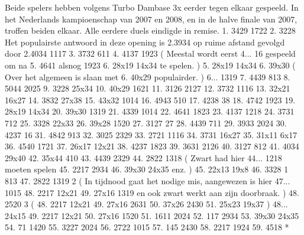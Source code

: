 \documentclass[letterpaper,10pt,english]{sphinxmanual}
\begin{document}
\begin{sphinxVerbatim}[commandchars=\\\{\}]
\PYGZob{} Beide spelers hebben volgens Turbo Dambase 3x eerder tegen elkaar
gespeeld. In het Nederlands kampioenschap van 2007 en 2008, en in de
halve finale van 2007, troffen beiden elkaar. Alle eerdere duels
eindigde in remise. \PYGZcb{} 1. 34\PYGZhy{}29 17\PYGZhy{}22 2. 32\PYGZhy{}28 \PYGZob{} Het populairste
antwoord in deze opening is 2.39\PYGZhy{}34 op ruime afstand gevolgd door
2.40\PYGZhy{}34 \PYGZcb{} 11\PYGZhy{}17 3. 37\PYGZhy{}32 6\PYGZhy{}11 4. 41\PYGZhy{}37 19\PYGZhy{}23 ( \PYGZob{} Meestal wordt eerst
\PYGZcb{} 4... 1\PYGZhy{}6 \PYGZob{} gespeeld om na \PYGZcb{} 5. 46\PYGZhy{}41 \PYGZob{} alsnog \PYGZcb{} 19\PYGZhy{}23 6. 28x19
14x34 \PYGZob{} te spelen. \PYGZcb{} ) 5. 28x19 14x34 6. 39x30 ( \PYGZob{} Over het algemeen
is slaan met \PYGZcb{} 6. 40x29 \PYGZob{} populairder. \PYGZcb{} ) 6... 13\PYGZhy{}19 7. 44\PYGZhy{}39 8\PYGZhy{}13
8. 50\PYGZhy{}44 20\PYGZhy{}25 9. 32\PYGZhy{}28 25x34 10. 40x29 16\PYGZhy{}21 11. 31\PYGZhy{}26 21\PYGZhy{}27
12. 37\PYGZhy{}32 11\PYGZhy{}16 13. 32x21 16x27 14. 38\PYGZhy{}32 27x38 15. 43x32 10\PYGZhy{}14
16. 49\PYGZhy{}43 5\PYGZhy{}10 17. 42\PYGZhy{}38 3\PYGZhy{}8 18. 47\PYGZhy{}42 19\PYGZhy{}23 19. 28x19 14x34
20. 39x30 13\PYGZhy{}19 21. 43\PYGZhy{}39 10\PYGZhy{}14 22. 46\PYGZhy{}41 18\PYGZhy{}23 23. 41\PYGZhy{}37 12\PYGZhy{}18
24. 37\PYGZhy{}31 7\PYGZhy{}12 25. 33\PYGZhy{}28 22x33 26. 39x28 15\PYGZhy{}20 27. 31\PYGZhy{}27 2\PYGZhy{}7
28. 44\PYGZhy{}39 7\PYGZhy{}11 29. 39\PYGZhy{}33 20\PYGZhy{}24 30. 42\PYGZhy{}37 1\PYGZhy{}6 31. 48\PYGZhy{}42 9\PYGZhy{}13 32. 30\PYGZhy{}25
23\PYGZhy{}29 33. 27\PYGZhy{}21 11\PYGZhy{}16 34. 37\PYGZhy{}31 16x27 35. 31x11 6x17 36. 45\PYGZhy{}40 17\PYGZhy{}21
37. 26x17 12x21 38. 42\PYGZhy{}37 18\PYGZhy{}23 39. 36\PYGZhy{}31 21\PYGZhy{}26 40. 31\PYGZhy{}27 8\PYGZhy{}12
41. 40\PYGZhy{}34 29x40 42. 35x44 4\PYGZhy{}10 43. 44\PYGZhy{}39 23\PYGZhy{}29 44. 28\PYGZhy{}22 13\PYGZhy{}18 ( \PYGZob{}
Zwart had hier \PYGZcb{} 44... 12\PYGZhy{}18 \PYGZob{} moeten spelen \PYGZcb{} 45. 22\PYGZhy{}17 29\PYGZhy{}34
46. 39x30 24x35 \PYGZob{} enz. \PYGZcb{} ) 45. 22x13 19x8 46. 33\PYGZhy{}28 \PYGZdl{}1 8\PYGZhy{}13 47. 28\PYGZhy{}22
13\PYGZhy{}19 \PYGZdl{}2 ( \PYGZob{} In tijdnood gaat het nodige mis, aangewezen is hier \PYGZcb{}
47... 10\PYGZhy{}15 48. 22\PYGZhy{}17 12x21 49. 27x16 13\PYGZhy{}19 \PYGZob{} en ook zwart werkt aan
zijn doorbraak. \PYGZcb{} ) 48. 25\PYGZhy{}20 \PYGZdl{}3 ( 48. 22\PYGZhy{}17 12x21 49. 27x16 26\PYGZhy{}31
50. 37x26 24\PYGZhy{}30 51. 25x23 19x37 ) 48... 24x15 49. 22\PYGZhy{}17 12x21
50. 27x16 15\PYGZhy{}20 51. 16\PYGZhy{}11 20\PYGZhy{}24 52. 11\PYGZhy{}7 29\PYGZhy{}34 53. 39x30 24x35
54. 7\PYGZhy{}1 14\PYGZhy{}20 55. 32\PYGZhy{}27 20\PYGZhy{}24 56. 27\PYGZhy{}22 10\PYGZhy{}15 57. 1\PYGZhy{}45 24\PYGZhy{}30
58. 22\PYGZhy{}17 19\PYGZhy{}24 59. 45\PYGZhy{}18 *
\end{sphinxVerbatim}
\end{document}
